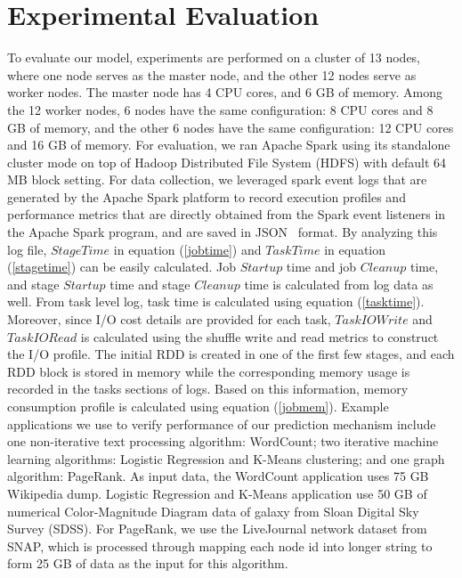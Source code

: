 \section{Experimental Evaluation}
\label{evaluation}

\noindent
To evaluate our model, experiments are performed on a cluster of 13 nodes, where one node serves as the master node, and the other 12 nodes serve as worker nodes. The master node has 4 CPU cores, and 6 GB of memory. Among the 12 worker nodes, 6 nodes have the same configuration: 8 CPU cores and 8 GB of memory, and the other 6 nodes have the same configuration: 12 CPU cores and 16 GB of memory. For evaluation, we ran Apache Spark using its standalone cluster mode on top of Hadoop Distributed File System (HDFS) with default 64 MB block setting. 
\noindent
For data collection, we leveraged spark event logs that are generated by the Apache Spark platform to record execution profiles and performance metrics that are directly obtained from the Spark event listeners in the Apache Spark program, and are saved in JSON~\cite{json} format. By analyzing this log file, $StageTime$ in equation (\ref{jobtime}) and $TaskTime$ in equation (\ref{stagetime}) can be easily calculated. Job $Startup$ time and job $Cleanup$ time, and stage $Startup$ time and stage $Cleanup$ time is calculated from log data as well. From task level log, task time is calculated using equation (\ref{tasktime}). Moreover, since I/O cost details are provided for each task, $TaskIOWrite$ and $TaskIORead$ is calculated using the shuffle write and read metrics to construct the I/O profile. The initial RDD is created in one of the first few stages, and each RDD block is stored in memory while the corresponding memory usage is recorded in the tasks sections of logs. Based on this information, memory consumption profile is calculated using equation (\ref{jobmem}). 
\noindent
Example applications we use to verify performance of our prediction mechanism include one non-iterative text processing algorithm: WordCount; two iterative machine learning algorithms: Logistic Regression and K-Means clustering; and one graph algorithm: PageRank. As input data, the WordCount application uses 75 GB Wikipedia dump. Logistic Regression and K-Means application use 50 GB of numerical Color-Magnitude Diagram data of galaxy from Sloan Digital Sky Survey (SDSS)\cite{sdss}. For PageRank, we use the LiveJournal network dataset from SNAP\cite{snap}, which is processed through mapping each node id into longer string to form 25 GB of data as the input for this algorithm.
